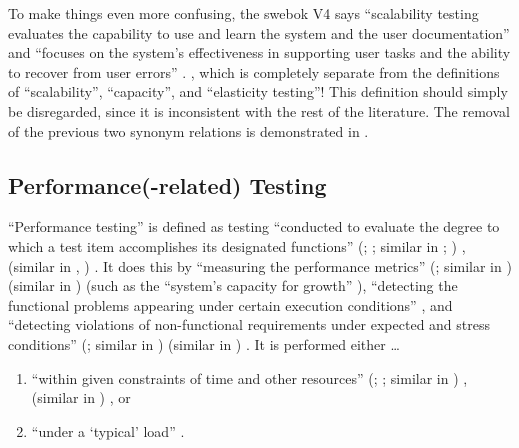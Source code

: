 To make things even more confusing, the \acs{swebok} V4 says ``scalability
testing evaluates the capability to use and learn the system and the user
documentation'' and ``focuses on the system's effectiveness in supporting user
tasks and the ability to recover from user errors'' \citep[p.~5-9]{SWEBOK2024}.
\swebokScalDef{}, which is completely separate from the definitions of
``scalability'', ``capacity'', and ``elasticity testing''! This definition
should simply be disregarded, since it is inconsistent with the rest of the
literature. The removal of the previous two synonym relations is demonstrated
in .

\subsection{Performance(-related) Testing}
\label{perf-test-rec}

``Performance testing'' is defined as testing ``conducted to evaluate the
degree to which a test item accomplishes its designated functions''
\ifnotpaper
    (\citealp[p.~7]{IEEE2022}; \citeyear[p.~320]{IEEE2017}; similar in
    \citeyear[pp.~38-39]{IEEE2021}; \citealp[p.~1187]{Moghadam2019})%
\else
    \cite[p.~320]{IEEE2017}, \cite[p.~7]{IEEE2022} (similar in
    \cite[pp.~38-39]{IEEE2021}, \cite[p.~1187]{Moghadam2019})%
\fi. It does this
by ``measuring the performance metrics''
\ifnotpaper
    (\citealp[p.~1187]{Moghadam2019}; similar in \citealpISTQB{})
\else
    \cite[p.~1187]{Moghadam2019} (similar in \cite{ISTQB})
\fi (such as the ``system's capacity for growth''
\citep[p.~23]{Gerrard2000b}), ``detecting the functional problems appearing
under certain execution conditions'' \citep[p.~1187]{Moghadam2019}, and
``detecting violations of non-functional requirements under expected and
stress conditions'' \ifnotpaper
    (\citealp[p.~1187]{Moghadam2019}; similar in \citealp[p.~5-9]{SWEBOK2024})%
\else
    \cite[p.~1187]{Moghadam2019} (similar in \cite[p.~5-9]{SWEBOK2024})%
\fi. It is performed either \dots\
\begin{enumerate}
    \item ``within given constraints of time and other resources''
          \ifnotpaper
              (\citealp[p.~7]{IEEE2022}; \citeyear[p.~320]{IEEE2017};
              similar in \citealp[p.~1187]{Moghadam2019})%
          \else
              \cite[p.~320]{IEEE2017}, \cite[p.~7]{IEEE2022} (similar
              in \cite[p.~1187]{Moghadam2019})%
          \fi, or
    \item ``under a `typical' load'' \citep[p.~39]{IEEE2021}.
\end{enumerate}

